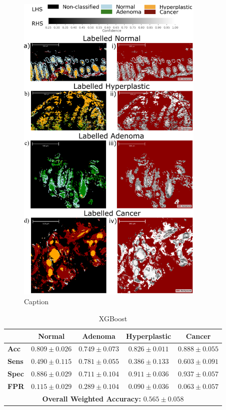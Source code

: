 \begin{figure}[htbp] 
    \centering 
    \includegraphics[width=0.8\textwidth]{Images/Confidence.png} 
    \caption{Caption} \label{fig:my-label}
\end{figure}

\begin{table}[ht] \centering \caption{XGBoost} \label{tab:xgboost}
\begin{tabular}{lcccc} \toprule & \textbf{Normal} & \textbf{Adenoma} &
\textbf{Hyperplastic} & \textbf{Cancer} \\ \midrule \textbf{Acc} & $0.809\pm0.
026$ & $0.749\pm0.073$ & $0.826\pm0.011$ & $0.888\pm0.055$ \\ \textbf{Sens} & $0.
490\pm0.115$ & $0.781\pm0.055$ & $0.386\pm0.133$ & $0.603\pm0.091$ \\
\textbf{Spec} & $0.886\pm0.029$ & $0.711\pm0.104$ & $0.911\pm0.036$ & $0.937\pm0.
057$ \\ \textbf{FPR} & $0.115\pm0.029$ & $0.289\pm0.104$ & $0.090\pm0.036$ & $0.
063\pm0.057$ \\ \midrule \multicolumn{5}{c}{\textbf{Overall Weighted Accuracy:}
$0.565\pm0.058$} \\ \bottomrule \end{tabular} \end{table}

